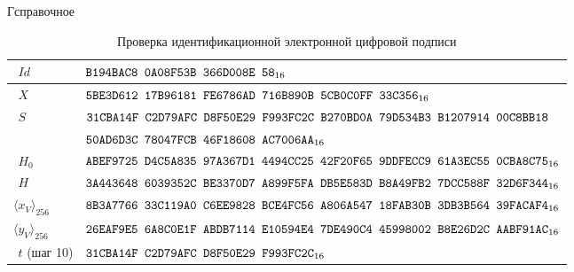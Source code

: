 \begin{appendix}{Г}{справочное}
\begin{table}[!h]
\caption{Проверка идентификационной электронной цифровой подписи}
\label{Table.TEST.IdVerify}
{\small
\begin{tabular}{|l|l|}
\hline
$\phantom{\langle}Id$ & 
$\texttt{B194BAC8~0A08F53B~366D008E~58}_{16}$\\
%
\hline
$\phantom{\langle}X$ & 
$\texttt{5BE3D612~17B96181~FE6786AD~716B890B~5CB0C0FF~33C356}_{16}$\\
%
\hline
$\phantom{\langle}S$ & 
$\texttt{31CBA14F~C2D79AFC~D8F50E29~F993FC2C~B270BD0A~79D534B3~B1207914~00C8BB18}$\\
&
$\texttt{50AD6D3C~78047FCB~46F18608~AC7006AA}_{16}$\\
\dhline
$\phantom{\langle}H_0$ & 
$\texttt{ABEF9725~D4C5A835~97A367D1~4494CC25~42F20F65~9DDFECC9~61A3EC55~0CBA8C75}_{16}$\\
%
\hline
$\phantom{\langle}H$ & 
$\texttt{3A443648~6039352C~BE3370D7~A899F5FA~DB5E583D~B8A49FB2~7DCC588F~32D6F344}_{16}$\\
%
\hline
$\langle x_V\rangle_{256}$ & 
$\texttt{8B3A7766~33C119A0~C6EE9828~BCE4FC56~A806A547~18FAB30B~3DB3B564~39FACAF4}_{16}$\\
%
\hline
$\langle y_V\rangle_{256}$ & 
$\texttt{26EAF9E5~6A8C0E1F~ABDB7114~E10594E4~7DE490C4~45998002~B8E26D2C~AABF91AC}_{16}$\\
\hline
$\phantom{\langle}t$ (шаг 10) & 
$\texttt{31CBA14F~C2D79AFC~D8F50E29~F993FC2C}_{16}$\\
\hline
\end{tabular}
}
\end{table}

\end{appendix}

